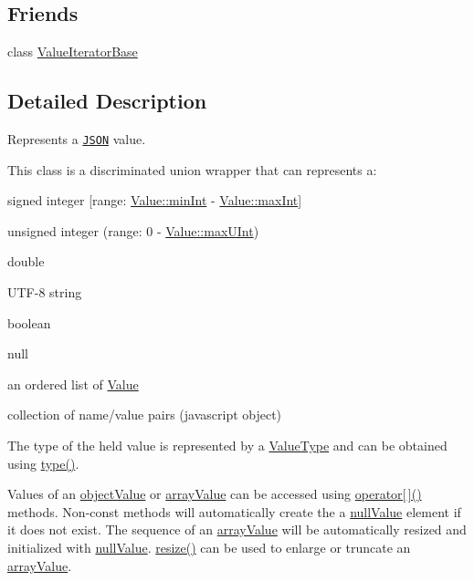 \subsection*{Friends}
\begin{DoxyCompactItemize}
\item 
class \hyperlink{class_json_1_1_value_a6bd095e101a936fb8db492964a15263d}{Value\+Iterator\+Base}
\end{DoxyCompactItemize}


\subsection{Detailed Description}
Represents a \href{http://www.json.org}{\tt J\+S\+ON} value. 

This class is a discriminated union wrapper that can represents a\+:
\begin{DoxyItemize}
\item signed integer \mbox{[}range\+: \hyperlink{class_json_1_1_value_ad062d227e00408ce594026959d6ed2e1}{Value\+::min\+Int} -\/ \hyperlink{class_json_1_1_value_af13109d78a22923e397dc2b60a74714c}{Value\+::max\+Int}\mbox{]}
\item unsigned integer (range\+: 0 -\/ \hyperlink{class_json_1_1_value_a905f07575ee561e5b0f0a57e8ea31462}{Value\+::max\+U\+Int})
\item double
\item U\+T\+F-\/8 string
\item boolean
\item \textquotesingle{}null\textquotesingle{}
\item an ordered list of \hyperlink{class_json_1_1_value}{Value}
\item collection of name/value pairs (javascript object)
\end{DoxyItemize}

The type of the held value is represented by a \hyperlink{namespace_json_a7d654b75c16a57007925868e38212b4e}{Value\+Type} and can be obtained using \hyperlink{class_json_1_1_value_a8ce61157a011894f0252ceed232312de}{type()}.

Values of an \hyperlink{namespace_json_a7d654b75c16a57007925868e38212b4ea6ca35c0a30ea3d1b8ec95c2d1e41a1a8}{object\+Value} or \hyperlink{namespace_json_a7d654b75c16a57007925868e38212b4eaa3025bfd271ef0b0c7c030c9118f8be7}{array\+Value} can be accessed using \hyperlink{class_json_1_1_value_a7d99f5dba388cdaa152ce6ef933d64ef}{operator\mbox{[}$\,$\mbox{]}()} methods. Non-\/const methods will automatically create the a \hyperlink{namespace_json_a7d654b75c16a57007925868e38212b4ea99922f3ccd58446e80e6055a7119b640}{null\+Value} element if it does not exist. The sequence of an \hyperlink{namespace_json_a7d654b75c16a57007925868e38212b4eaa3025bfd271ef0b0c7c030c9118f8be7}{array\+Value} will be automatically resized and initialized with \hyperlink{namespace_json_a7d654b75c16a57007925868e38212b4ea99922f3ccd58446e80e6055a7119b640}{null\+Value}. \hyperlink{class_json_1_1_value_aa284353271ada427dbfa04a42f2be407}{resize()} can be used to enlarge or truncate an \hyperlink{namespace_json_a7d654b75c16a57007925868e38212b4eaa3025bfd271ef0b0c7c030c9118f8be7}{array\+Value}.

